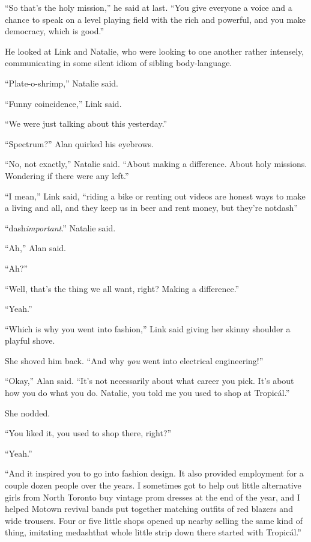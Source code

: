 ``So that's the holy mission,'' he said at last.  ``You give everyone
a voice and a chance to speak on a level playing field with the rich
and powerful, and you make democracy, which is good.''

He looked at Link and Natalie, who were looking to one another rather
intensely, communicating in some silent idiom of sibling
body-language.

``Plate-o-shrimp,'' Natalie said.

``Funny coincidence,'' Link said.

``We were just talking about this yesterday.''

``Spectrum?'' Alan quirked his eyebrows.

``No, not exactly,'' Natalie said.  ``About making a difference. 
About holy missions.  Wondering if there were any left.''

``I mean,'' Link said, ``riding a bike or renting out videos are
honest ways to make a living and all, and they keep us in beer and
rent money, but they're notdash{}''

``dash{}\textit{important}.'' Natalie said.

``Ah,'' Alan said.

``Ah?''

``Well, that's the thing we all want, right?  Making a difference.''

``Yeah.''

``Which is why you went into fashion,'' Link said giving her skinny
shoulder a playful shove.

She shoved him back.  ``And why \textit{you} went into electrical
engineering!''

``Okay,'' Alan said.  ``It's not necessarily about what career you
pick.  It's about how you do what you do.  Natalie, you told me you
used to shop at Tropic\'{a}l.''

She nodded.

``You liked it, you used to shop there, right?''

``Yeah.''

``And it inspired you to go into fashion design.  It also provided
employment for a couple dozen people over the years.  I sometimes got
to help out little alternative girls from North Toronto buy vintage
prom dresses at the end of the year, and I helped Motown revival bands
put together matching outfits of red blazers and wide trousers.  Four
or five little shops opened up nearby selling the same kind of thing,
imitating medash{}that whole little strip down there started with
Tropic\'{a}l.''

